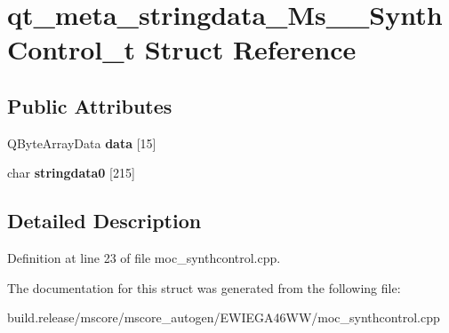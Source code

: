 \hypertarget{structqt__meta__stringdata___ms_____synth_control__t}{}\section{qt\+\_\+meta\+\_\+stringdata\+\_\+\+Ms\+\_\+\+\_\+\+Synth\+Control\+\_\+t Struct Reference}
\label{structqt__meta__stringdata___ms_____synth_control__t}
\subsection*{Public Attributes}
\begin{DoxyCompactItemize}
\item 
\mbox{\label{structqt__meta__stringdata___ms_____synth_control__t_af6233d98bd87942c341e46507f170c0f}} 
Q\+Byte\+Array\+Data {\bfseries data} \mbox{[}15\mbox{]}
\item 
\mbox{\label{structqt__meta__stringdata___ms_____synth_control__t_aba3de76daaa9fb30a25d55b4316273d2}} 
char {\bfseries stringdata0} \mbox{[}215\mbox{]}
\end{DoxyCompactItemize}


\subsection{Detailed Description}


Definition at line 23 of file moc\+\_\+synthcontrol.\+cpp.



The documentation for this struct was generated from the following file\+:\begin{DoxyCompactItemize}
\item 
build.\+release/mscore/mscore\+\_\+autogen/\+E\+W\+I\+E\+G\+A46\+W\+W/moc\+\_\+synthcontrol.\+cpp\end{DoxyCompactItemize}
